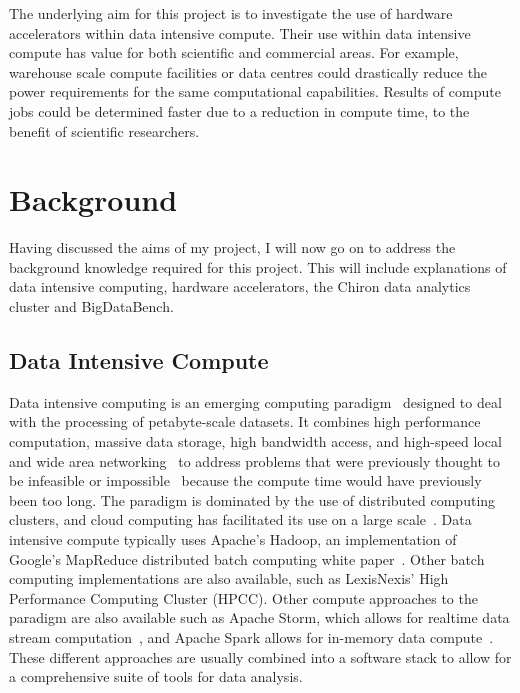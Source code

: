 \documentclass[12pt,a4paper]{article}
\begin{document}
			The underlying aim for this project is to investigate the use of hardware accelerators within data intensive compute. Their use within data intensive compute has value for both scientific and commercial areas. For example, warehouse scale compute facilities or data centres could drastically reduce the power requirements for the same computational capabilities. Results of compute jobs could be determined faster due to a reduction in compute time, to the benefit of scientific researchers.
		

	\section{Background} %
	\label{sec:background}

		Having discussed the aims of my project, I will now go on to address the background knowledge required for this project. This  will include explanations of data intensive computing, hardware accelerators, the Chiron data analytics cluster and BigDataBench.

		\subsection{Data Intensive Compute} %
		\label{ssub:data_intensive_compute}
		
			Data intensive computing is an emerging computing paradigm~\cite{data-intensive-compute-paradigm} designed to deal with the processing of petabyte-scale datasets. It combines high performance computation, massive data storage, high bandwidth access, and high-speed local and wide area networking~\cite{parallel-data-intensive-compute} to address problems that were previously thought to be infeasible or impossible~\cite{cloud-computing-handbook} because the compute time would have previously been too long. The paradigm is dominated by the use of distributed computing clusters, and cloud computing has facilitated its use on a large scale~\cite{cloud-computing-handbook}. Data intensive compute typically uses Apache’s Hadoop, an implementation of Google’s MapReduce distributed batch computing white paper~\cite{data-science-big-data}. Other batch computing implementations are also available, such as LexisNexis’ High Performance Computing Cluster (HPCC). Other compute approaches to the paradigm are also available such as Apache Storm, which allows for realtime data stream computation~\cite{apache-storm}, and Apache Spark allows for in-memory data compute~\cite{apache-spark}. These different approaches are usually combined into a software stack to allow for a comprehensive suite of tools for data analysis.
\end{document}
